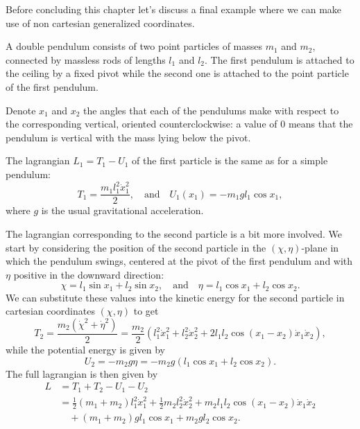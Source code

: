 \documentclass[english,fontsize=11pt,paper=a5,oneside]{scrbook}
\theoremstyle{definition}
\newenvironment{example}
  {\pushQED{\qed}\renewcommand{\qedsymbol}{$\lozenge$}\examplex}
  {\popQED\endexamplex}
\begin{document}
Before concluding this chapter let's discuss a final example where we can make use of non cartesian generalized coordinates.

\begin{example}[Double pendulum]\label{ex:2pendulum}
    A double pendulum consists of two point particles of masses $m_1$ and $m_2$, connected by massless rods of lengths $l_1$ and $l_2$. The first pendulum is attached to the ceiling by a fixed pivot while the second one is attached to the point particle of the first pendulum.

    Denote $x_1$ and $x_2$ the angles that each of the pendulums make with respect to the corresponding vertical, oriented counterclockwise: a value of $0$ means that the pendulum is vertical with the mass lying below the pivot.
    
    The lagrangian $L_1 = T_1 - U_1$ of the first particle is the same as for a simple pendulum:
    \begin{equation}
        T_1 = \frac{m_1 l_1^2 \dot x_1^2}2,
        \quad\mbox{and}\quad
        U_1(x_1) = -m_1 g l_1 \cos x_1,
    \end{equation}
    where $g$ is the usual gravitational acceleration.

    The lagrangian corresponding to the second particle is a bit more involved. We start by considering the position of the second particle in the $(\chi,\eta)$-plane in which the pendulum swings, centered at the pivot of the first pendulum and with $\eta$ positive in the downward direction:
    \begin{equation}
        \chi = l_1\sin x_1 + l_2\sin x_2,
        \quad\mbox{and}\quad
        \eta = l_1\cos x_1 + l_2\cos x_2.
    \end{equation}
    We can substitute these values into the kinetic energy for the second particle in cartesian coordinates $(\chi,\eta)$ to get
    \begin{equation}
        T_2 = \frac {m_2 (\dot\chi^2 + \dot\eta^2)}2
            = \frac {m_2}2 \left(
                l_1^2 \dot x_1^2 + l_2^2 \dot x_2^2
                + 2l_1l_2 \cos(x_1 -x_2)\dot x_1 \dot x_2
                \right),
    \end{equation}
    while the potential energy is given by
    \begin{equation}
        U_2 = -m_2 g \eta = -m_2g (l_1\cos x_1 + l_2\cos x_2).
    \end{equation}
    The full lagrangian is then given by
    \begin{align}
        L &= T_1 + T_2 - U_1 - U_2 \\
          &= \frac12 (m_1 + m_2)  l_1^2 \dot x_1^2
             + \frac 12 m_2 l_2^2 \dot x_2^2
             + m_2l_1l_2 \cos(x_1 -x_2)\dot x_1 \dot x_2 \\
             &\quad+ (m_1 + m_2) g l_1 \cos x_1
             + m_2gl_2\cos x_2.
    \end{align}


\end{example}
\end{document}

